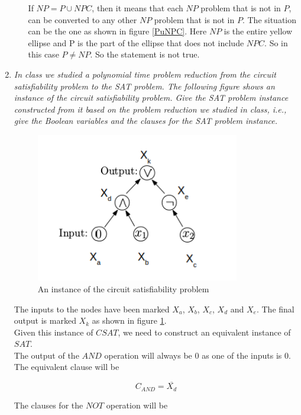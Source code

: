 \documentclass[paper=a4, fontsize=11pt]{scrartcl} %
\numberwithin{equation}{section} %
\numberwithin{figure}{section} %
\numberwithin{table}{section} %
\begin{document}
\begin{enumerate}
\begin{enumerate}
If $NP=P \cup NPC$, then it means that each $NP$ problem that is not in $P$, can be converted to any other $NP$ problem that is not in $P$. The situation can be the one as shown in figure \ref{PuNPC}. Here $NP$ is the entire yellow ellipse and P is the part of the ellipse that does not include $NPC$. So in this case $P \neq NP$. So the statement is not true.
    
  \end{enumerate}
  
  \item \textit{In class we studied a polynomial time problem reduction from the circuit satisfiability problem to the SAT problem. The following figure shows an instance of the circuit satisfiability problem. Give the SAT problem instance constructed from it based on the problem reduction we studied in class, i.e., give the Boolean variables and the clauses for the SAT problem instance.}

  
	\begin{figure}[!h]
		\centering
		\includegraphics[width=3.5in]{CSAT.png}
		\caption{An instance of the circuit satisfiability problem}
		\label{CSAT}
	\end{figure}  

The inputs to the nodes have been marked $X_a$, $X_b$, $X_c$, $X_d$ and $X_e$. The final output is marked $X_k$ as shown in figure \ref{CSAT}.\\

Given this instance of $CSAT$, we need to construct an equivalent instance of $SAT$.\\

The output of the $AND$ operation will always be $0$ as one of the inputs is $0$. The equivalent clause will be 

$$
C_{AND} = \overline{X_d}
$$

The clauses for the $NOT$ operation will be


\end{enumerate}
\end{document}
